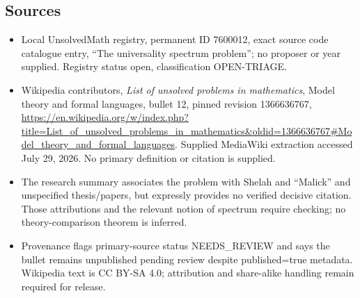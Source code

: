 \documentclass[11pt]{article}
\begin{document}
\subsection{Sources}
\begin{itemize}
\item Local UnsolvedMath registry, permanent ID 7600012, exact source code catalogue entry, ``The universality spectrum problem''; no proposer or year supplied. Registry status open, classification OPEN-TRIAGE.
\item Wikipedia contributors, \emph{List of unsolved problems in mathematics}, Model theory and formal languages, bullet 12, pinned revision 1366636767, \url{https://en.wikipedia.org/w/index.php?title=List_of_unsolved_problems_in_mathematics&oldid=1366636767#Model_theory_and_formal_languages}. Supplied MediaWiki extraction accessed July 29, 2026. No primary definition or citation is supplied.
\item The research summary associates the problem with Shelah and ``Malick'' and unspecified thesis/papers, but expressly provides no verified decisive citation. Those attributions and the relevant notion of spectrum require checking; no theory-comparison theorem is inferred.
\item Provenance flags primary-source status NEEDS\_REVIEW and says the bullet remains unpublished pending review despite published=true metadata. Wikipedia text is CC BY-SA 4.0; attribution and share-alike handling remain required for release.
\end{itemize}
\end{document}
